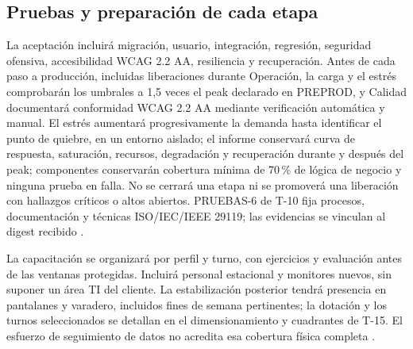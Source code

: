 \subsection{Pruebas y preparación de cada etapa}
La aceptación incluirá migración, usuario, integración, regresión, seguridad ofensiva, accesibilidad WCAG 2.2 AA, resiliencia y recuperación. Antes de cada paso a producción, incluidas liberaciones durante Operación, la carga y el estrés comprobarán los umbrales a 1,5 veces el peak declarado en PREPROD, y Calidad documentará conformidad WCAG 2.2 AA mediante verificación automática y manual. El estrés aumentará progresivamente la demanda hasta identificar el punto de quiebre, en un entorno aislado; el informe conservará curva de respuesta, saturación, recursos, degradación y recuperación durante y después del peak; componentes conservarán cobertura mínima de 70\,\% de lógica de negocio y ninguna prueba en falla. No se cerrará una etapa ni se promoverá una liberación con hallazgos críticos o altos abiertos. PRUEBAS-6 de T-10 fija procesos, documentación y técnicas ISO/IEC/IEEE 29119; las evidencias se vinculan al digest recibido \parencite[cap.~20, secc.~20.1, pp.~34--35]{bases-transversales}.

La capacitación se organizará por perfil y turno, con ejercicios y evaluación antes de las ventanas protegidas. Incluirá personal estacional y monitores nuevos, sin suponer un área TI del cliente. La estabilización posterior tendrá presencia en pantalanes y varadero, incluidos fines de semana pertinentes; la dotación y los turnos seleccionados se detallan en el dimensionamiento y cuadrantes de T-15. El esfuerzo de seguimiento de datos no acredita esa cobertura física completa \parencite[cap.~22, RT-22.01--RT-22.07; p.~38]{bases-transversales}.
